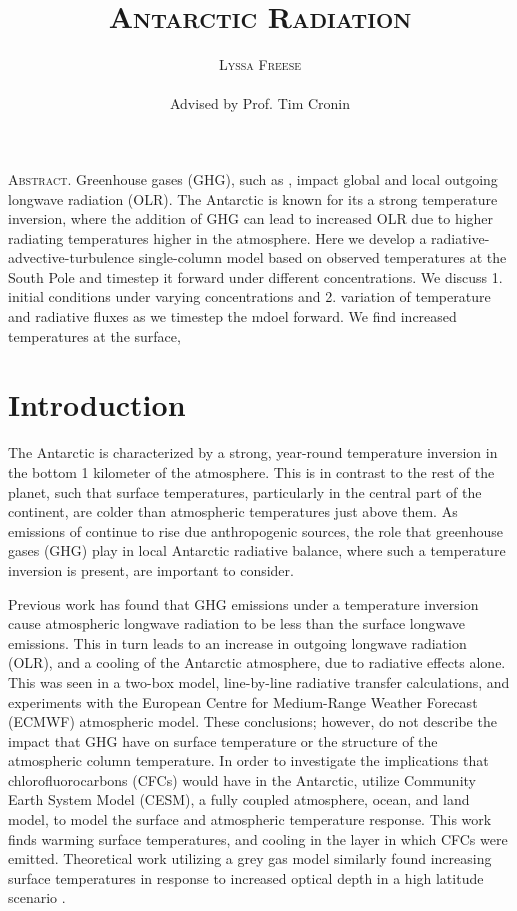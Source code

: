 \documentclass[12]{article}
\title{{\textsc{\Large Antarctic Radiation}}}
\author{\textsc{Lyssa Freese}
\\\\
Advised by Prof. Tim Cronin}
\begin{document}
\maketitle
\thispagestyle{empty}

\setlength{\leftskip}{1.1cm}
\setlength{\rightskip}{1.1cm}


\bigskip
\bigskip

{\textsc{Abstract.} }
Greenhouse gases (GHG), such as , impact global and local outgoing longwave radiation (OLR). The Antarctic is known for its a strong temperature inversion, where the addition of GHG can lead to increased OLR due to higher radiating temperatures higher in the atmosphere. Here we develop a radiative-advective-turbulence single-column model based on observed temperatures at the South Pole and timestep it forward under different  concentrations. We discuss 1. initial conditions under varying  concentrations and 2. variation of temperature and radiative fluxes as we timestep the mdoel forward. We find increased temperatures at the surface, 
\bigskip
\bigskip 
\clearpage
\setcounter{page}{1}

\setlength{\leftskip}{0cm}
\setlength{\rightskip}{0cm}

\section{Introduction}
The Antarctic is characterized by a strong, year-round temperature inversion in the bottom 1 kilometer of the atmosphere. This is in contrast to the rest of the planet, such that surface temperatures, particularly in the central part of the continent, are colder than atmospheric temperatures just above them\citep{hudson_look_2005}. As emissions of  continue to rise due anthropogenic sources, the role that greenhouse gases (GHG) play in local Antarctic radiative balance, where such a temperature inversion is present, are important to consider.

Previous work has found that GHG emissions under a temperature inversion cause atmospheric longwave radiation to be less than the surface longwave emissions. This in turn leads to an increase in outgoing longwave radiation (OLR), and a cooling of the Antarctic atmosphere, due to radiative effects alone\citep{schmithusen_how_2015}. This was seen in a two-box model, line-by-line radiative transfer calculations, and experiments with the European Centre for Medium-Range Weather Forecast (ECMWF) atmospheric model. These conclusions; however, do not describe the impact that GHG have on surface temperature or the structure of the atmospheric column temperature. In order to investigate the implications that chlorofluorocarbons (CFCs) would have in the Antarctic, \cite{flanner_climate_2018} utilize Community Earth System Model (CESM), a fully coupled atmosphere, ocean, and land model, to model the surface and atmospheric temperature response. This work finds warming surface temperatures, and cooling in the layer in which CFCs were emitted. Theoretical work utilizing a grey gas model similarly found increasing surface temperatures in response to increased optical depth in a high latitude scenario \citep{payne_conceptual_2015}.
\end{document}
